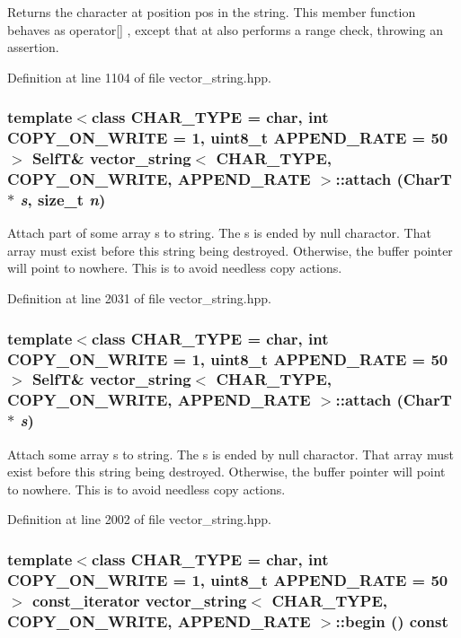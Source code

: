 Returns the character at position pos in the string. This member function behaves as operator\mbox{[}\mbox{]} , except that at also performs a range check, throwing an assertion. 

Definition at line 1104 of file vector\_\-string.hpp.\hypertarget{classvector__string_2be6a4b71a784962fc9c8b619cf210d6}{
\subsubsection[{attach}]{\setlength{\rightskip}{0pt plus 5cm}template$<$class CHAR\_\-TYPE  = char, int COPY\_\-ON\_\-WRITE = 1, uint8\_\-t APPEND\_\-RATE = 50$>$ {\bf SelfT}\& {\bf vector\_\-string}$<$ CHAR\_\-TYPE, COPY\_\-ON\_\-WRITE, APPEND\_\-RATE $>$::attach (CharT $\ast$ {\em s}, \/  size\_\-t {\em n})}}
\label{classvector__string_2be6a4b71a784962fc9c8b619cf210d6}


Attach part of some array s to string. The s is ended by null charactor. That array must exist before this string being destroyed. Otherwise, the buffer pointer will point to nowhere. This is to avoid needless copy actions. 

Definition at line 2031 of file vector\_\-string.hpp.\hypertarget{classvector__string_f0a88c736a417b3ba61ac3b5231b0fa7}{
\subsubsection[{attach}]{\setlength{\rightskip}{0pt plus 5cm}template$<$class CHAR\_\-TYPE  = char, int COPY\_\-ON\_\-WRITE = 1, uint8\_\-t APPEND\_\-RATE = 50$>$ {\bf SelfT}\& {\bf vector\_\-string}$<$ CHAR\_\-TYPE, COPY\_\-ON\_\-WRITE, APPEND\_\-RATE $>$::attach (CharT $\ast$ {\em s})}}
\label{classvector__string_f0a88c736a417b3ba61ac3b5231b0fa7}


Attach some array s to string. The s is ended by null charactor. That array must exist before this string being destroyed. Otherwise, the buffer pointer will point to nowhere. This is to avoid needless copy actions. 

Definition at line 2002 of file vector\_\-string.hpp.\hypertarget{classvector__string_8e6b66cfacb75c8ae4990096c841a812}{
\subsubsection[{begin}]{\setlength{\rightskip}{0pt plus 5cm}template$<$class CHAR\_\-TYPE  = char, int COPY\_\-ON\_\-WRITE = 1, uint8\_\-t APPEND\_\-RATE = 50$>$ const\_\-iterator {\bf vector\_\-string}$<$ CHAR\_\-TYPE, COPY\_\-ON\_\-WRITE, APPEND\_\-RATE $>$::begin () const}}
\label{classvector__string_8e6b66cfacb75c8ae4990096c841a812}



